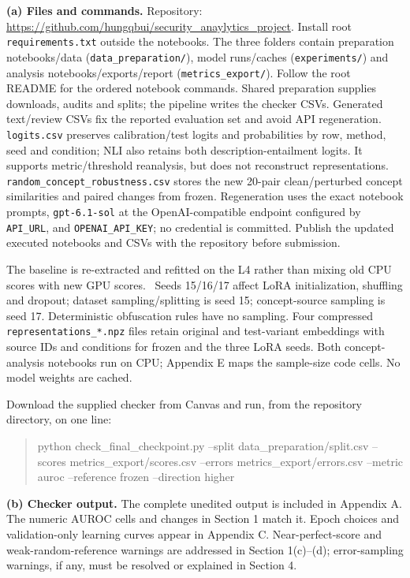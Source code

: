 \documentclass[10pt]{article}
\makeatletter
\renewcommand\section{\@startsection{section}{1}{0pt}{1.2ex plus .5ex minus .2ex}{.6ex plus .2ex}{\normalfont\large\bfseries}}
\newcommand{\code}[1]{\nolinkurl{#1}}
\makeatother
\begin{document}
\newpage
\section{Reproducibility}
\textbf{(a) Files and commands.} Repository: \url{https://github.com/hungqbui/security_anaylytics_project}. Install root \code{requirements.txt} outside the notebooks. The three folders contain preparation notebooks/data (\code{data\_preparation/}), model runs/caches (\code{experiments/}) and analysis notebooks/exports/report (\code{metrics\_export/}). Follow the root README for the ordered notebook commands. Shared preparation supplies downloads, audits and splits; the pipeline writes the checker CSVs. Generated text/review CSVs fix the reported evaluation set and avoid API regeneration. \code{logits.csv} preserves calibration/test logits and probabilities by row, method, seed and condition; NLI also retains both description-entailment logits. It supports metric/threshold reanalysis, but does not reconstruct representations. \code{random\_concept\_robustness.csv} stores the new 20-pair clean/perturbed concept similarities and paired changes from frozen. Regeneration uses the exact notebook prompts, \code{gpt-6.1-sol} at the OpenAI-compatible endpoint configured by \code{API\_URL}, and \code{OPENAI\_API\_KEY}; no credential is committed. Publish the updated executed notebooks and CSVs with the repository before submission.

The baseline is re-extracted and refitted on the L4 rather than mixing old CPU scores with new GPU scores. \BaselineReproduction\ Seeds 15/16/17 affect LoRA initialization, shuffling and dropout; dataset sampling/splitting is seed 15; concept-source sampling is seed 17. Deterministic obfuscation rules have no sampling. Four compressed \code{representations\_*.npz} files retain original and test-variant embeddings with source IDs and conditions for frozen and the three LoRA seeds. Both concept-analysis notebooks run on CPU; Appendix E maps the sample-size code cells. No model weights are cached. \TruncationDescription

Download the supplied checker from Canvas and run, from the repository directory, on one line:
\begin{quote}\footnotesize\ttfamily
python check\_final\_checkpoint.py --split data\_preparation/split.csv --scores metrics\_export/scores.csv --errors metrics\_export/errors.csv --metric auroc --reference frozen --direction higher
\end{quote}
\textbf{(b) Checker output.} The complete unedited output is included in Appendix A. The numeric AUROC cells and changes in Section 1 match it. Epoch choices and validation-only learning curves appear in Appendix C. Near-perfect-score and weak-random-reference warnings are addressed in Section 1(c)--(d); error-sampling warnings, if any, must be resolved or explained in Section 4.
\end{document}
